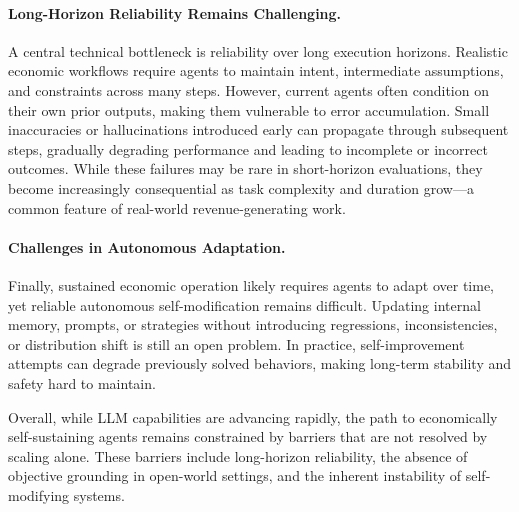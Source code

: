 \paragraph{Long-Horizon Reliability Remains Challenging.}
A central technical bottleneck is reliability over long execution horizons. Realistic economic workflows require agents to maintain intent, intermediate assumptions, and constraints across many steps. However, current agents often condition on their own prior outputs, making them vulnerable to error accumulation. Small inaccuracies or hallucinations introduced early can propagate through subsequent steps, gradually degrading performance and leading to incomplete or incorrect outcomes. While these failures may be rare in short-horizon evaluations, they become increasingly consequential as task complexity and duration grow---a common feature of real-world revenue-generating work.

\paragraph{Challenges in Autonomous Adaptation.}
Finally, sustained economic operation likely requires agents to adapt over time, yet reliable autonomous self-modification remains difficult. Updating internal memory, prompts, or strategies without introducing regressions, inconsistencies, or distribution shift is still an open problem. In practice, self-improvement attempts can degrade previously solved behaviors, making long-term stability and safety hard to maintain.

Overall, while LLM capabilities are advancing rapidly, the path to economically self-sustaining agents remains constrained by barriers that are not resolved by scaling alone. These barriers include long-horizon reliability, the absence of objective grounding in open-world settings, and the inherent instability of self-modifying systems.







